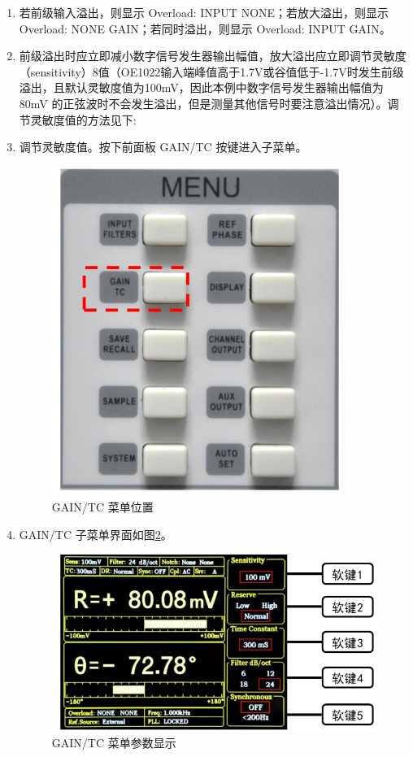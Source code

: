 \documentclass[11pt,a4paper]{ctexart}
\begin{document}
\begin{enumerate}[(1)]
		\item 若前级输入溢出，则显示 Overload: INPUT NONE；若放大溢出，则显示 Overload: NONE GAIN；若同时溢出，则显示 Overload: INPUT GAIN。
		
		\item 前级溢出时应立即减小数字信号发生器输出幅值，放大溢出应立即调节灵敏度（sensitivity）8值（OE1022输入端峰值高于1.7V或谷值低于-1.7V时发生前级溢出，且默认灵敏度值为100mV，因此本例中数字信号发生器输出幅值为 80mV 的正弦波时不会发生溢出，但是测量其他信号时要注意溢出情况）。调节灵敏度值的方法见下:
		
		\item 调节灵敏度值。按下前面板 GAIN/TC 按键进入子菜单。
		\begin{figure}[H]
			\centering
			\includegraphics[scale=0.5]{D1-14}
			\caption{GAIN/TC 菜单位置}\label{D1-14}
		\end{figure}
	
		\item GAIN/TC 子菜单界面如图\ref{D1-15}。
		\begin{figure}[H]
			\centering
			\includegraphics[scale=0.5]{D1-15}
			\caption{GAIN/TC 菜单参数显示}\label{D1-15}
		\end{figure}
		

\end{enumerate}
\end{document}
